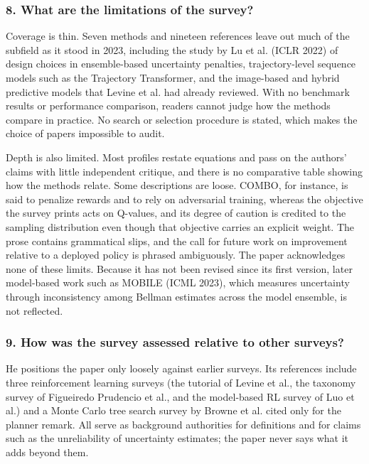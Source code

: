 \documentclass[11pt]{article}
\newcommand{\question}[1]{\subsubsection*{#1}}
\begin{document}
\question{8. What are the limitations of the survey?}

Coverage is thin. Seven methods and nineteen references leave out much of the subfield as it stood in 2023, including the study by Lu et al. (ICLR 2022) of design choices in ensemble-based uncertainty penalties, trajectory-level sequence models such as the Trajectory Transformer, and the image-based and hybrid predictive models that Levine et al. had already reviewed. With no benchmark results or performance comparison, readers cannot judge how the methods compare in practice. No search or selection procedure is stated, which makes the choice of papers impossible to audit.

Depth is also limited. Most profiles restate equations and pass on the authors' claims with little independent critique, and there is no comparative table showing how the methods relate. Some descriptions are loose. COMBO, for instance, is said to penalize rewards and to rely on adversarial training, whereas the objective the survey prints acts on Q-values, and its degree of caution is credited to the sampling distribution even though that objective carries an explicit weight. The prose contains grammatical slips, and the call for future work on improvement relative to a deployed policy is phrased ambiguously. The paper acknowledges none of these limits. Because it has not been revised since its first version, later model-based work such as MOBILE (ICML 2023), which measures uncertainty through inconsistency among Bellman estimates across the model ensemble, is not reflected.

\question{9. How was the survey assessed relative to other surveys?}

He positions the paper only loosely against earlier surveys. Its references include three reinforcement learning surveys (the tutorial of Levine et al., the taxonomy survey of Figueiredo Prudencio et al., and the model-based RL survey of Luo et al.) and a Monte Carlo tree search survey by Browne et al. cited only for the planner remark. All serve as background authorities for definitions and for claims such as the unreliability of uncertainty estimates; the paper never says what it adds beyond them.
\end{document}
